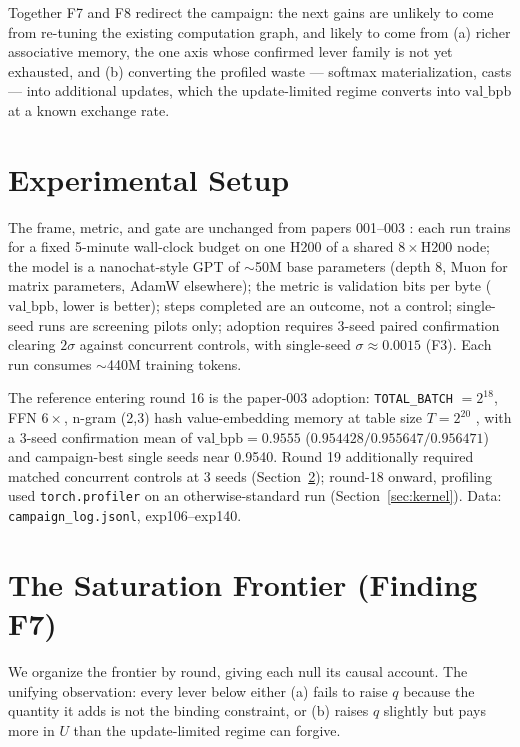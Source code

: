 \documentclass{article}
\newcommand{\valbpb}{\mathrm{val\_bpb}}
\begin{document}
Together F7 and F8 redirect the campaign: the next gains are unlikely to come from re-tuning the existing computation graph, and likely to come from (a) richer associative memory, the one axis whose confirmed lever family is not yet exhausted, and (b) converting the profiled waste --- softmax materialization, casts --- into additional updates, which the update-limited regime converts into $\valbpb$ at a known exchange rate.

\section{Experimental Setup}
\label{sec:setup}

The frame, metric, and gate are unchanged from papers 001--003 \cite{ophis2026paper001,ophis2026paper002,ophis2026paper003}: each run trains for a fixed 5-minute wall-clock budget on one H200 of a shared $8\times$H200 node; the model is a nanochat-style GPT \cite{karpathy2025nanochat} of $\sim$50M base parameters (depth 8, Muon \cite{jordan2024muon} for matrix parameters, AdamW elsewhere); the metric is validation bits per byte ($\valbpb$, lower is better); steps completed are an outcome, not a control; single-seed runs are screening pilots only; adoption requires 3-seed paired confirmation clearing $2\sigma$ against concurrent controls, with single-seed $\sigma \approx 0.0015$ (F3). Each run consumes $\sim$440M training tokens.

The reference entering round 16 is the paper-003 adoption: \texttt{TOTAL\_BATCH} $=2^{18}$, FFN $6\times$, n-gram (2,3) hash value-embedding memory at table size $T = 2^{20}$ \cite{engram2026,svenstrup2017hash}, with a 3-seed confirmation mean of $\valbpb = 0.9555$ ($0.954428/0.955647/0.956471$) and campaign-best single seeds near 0.9540. Round 19 additionally required matched concurrent controls at 3 seeds (Section~\ref{sec:frontier}); round-18 onward, profiling used \texttt{torch.profiler} on an otherwise-standard run (Section~\ref{sec:kernel}). Data: \texttt{campaign\_log.jsonl}, exp106--exp140.

\section{The Saturation Frontier (Finding F7)}
\label{sec:frontier}

We organize the frontier by round, giving each null its causal account. The unifying observation: every lever below either (a) fails to raise $q$ because the quantity it adds is not the binding constraint, or (b) raises $q$ slightly but pays more in $U$ than the update-limited regime can forgive.
\end{document}
